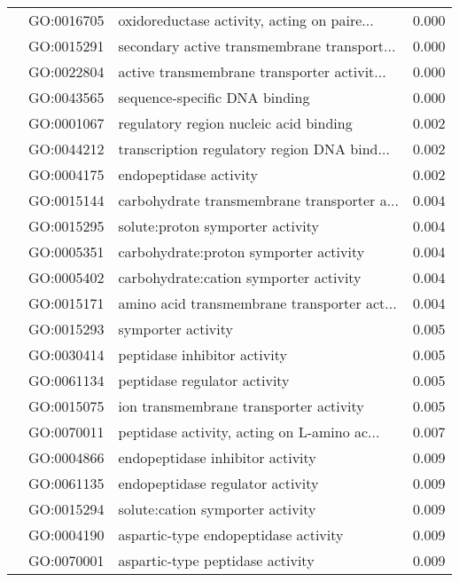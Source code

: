 \begin{longtable}{lllr}
   & GO:0016705 &  oxidoreductase activity, acting on paire... &         0.000 \\
   & GO:0015291 &  secondary active transmembrane transport... &         0.000 \\
   & GO:0022804 &  active transmembrane transporter activit... &         0.000 \\
   & GO:0043565 &                sequence-specific DNA binding &         0.000 \\
   & GO:0001067 &       regulatory region nucleic acid binding &         0.002 \\
   & GO:0044212 &  transcription regulatory region DNA bind... &         0.002 \\
   & GO:0004175 &                       endopeptidase activity &         0.002 \\
   & GO:0015144 &  carbohydrate transmembrane transporter a... &         0.004 \\
   & GO:0015295 &             solute:proton symporter activity &         0.004 \\
   & GO:0005351 &       carbohydrate:proton symporter activity &         0.004 \\
   & GO:0005402 &       carbohydrate:cation symporter activity &         0.004 \\
   & GO:0015171 &  amino acid transmembrane transporter act... &         0.004 \\
   & GO:0015293 &                           symporter activity &         0.005 \\
   & GO:0030414 &                 peptidase inhibitor activity &         0.005 \\
   & GO:0061134 &                 peptidase regulator activity &         0.005 \\
   & GO:0015075 &       ion transmembrane transporter activity &         0.005 \\
   & GO:0070011 &  peptidase activity, acting on L-amino ac... &         0.007 \\
   & GO:0004866 &             endopeptidase inhibitor activity &         0.009 \\
   & GO:0061135 &             endopeptidase regulator activity &         0.009 \\
   & GO:0015294 &             solute:cation symporter activity &         0.009 \\
   & GO:0004190 &         aspartic-type endopeptidase activity &         0.009 \\
   & GO:0070001 &             aspartic-type peptidase activity &         0.009 \\

\end{longtable}
